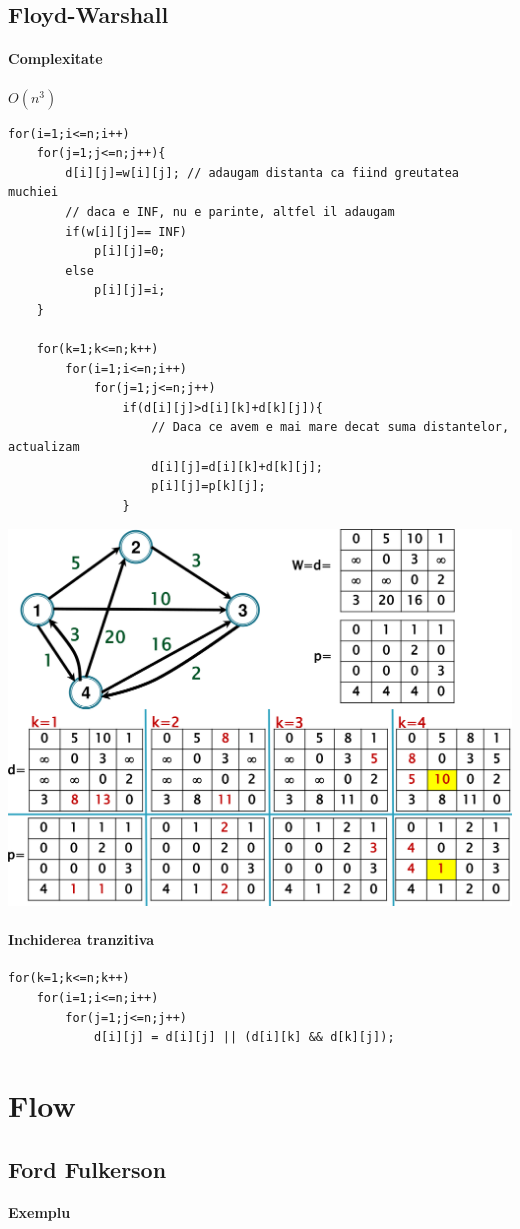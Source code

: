 \documentclass{article}
\begin{document}
\subsection*{Floyd-Warshall}
\paragraph*{Complexitate} $O(n^3)$

\begin{lstlisting}
for(i=1;i<=n;i++)
    for(j=1;j<=n;j++){
        d[i][j]=w[i][j]; // adaugam distanta ca fiind greutatea muchiei
        // daca e INF, nu e parinte, altfel il adaugam
        if(w[i][j]== INF)
            p[i][j]=0;
        else
            p[i][j]=i;
    }

    for(k=1;k<=n;k++)
        for(i=1;i<=n;i++)
            for(j=1;j<=n;j++)
                if(d[i][j]>d[i][k]+d[k][j]){ 
                    // Daca ce avem e mai mare decat suma distantelor, actualizam
                    d[i][j]=d[i][k]+d[k][j];
                    p[i][j]=p[k][j];
                }
   \end{lstlisting}

\begin{center}
    \includegraphics[scale=0.3]{9_floydwarshall.png}
\end{center}

\paragraph*{Inchiderea tranzitiva}
\begin{center}
    \begin{lstlisting}
for(k=1;k<=n;k++)
    for(i=1;i<=n;i++)
        for(j=1;j<=n;j++)
            d[i][j] = d[i][j] || (d[i][k] && d[k][j]);
        \end{lstlisting}
\end{center}

\section{Flow}
\subsection*{Ford Fulkerson}
\paragraph*{Exemplu}
\end{document}
